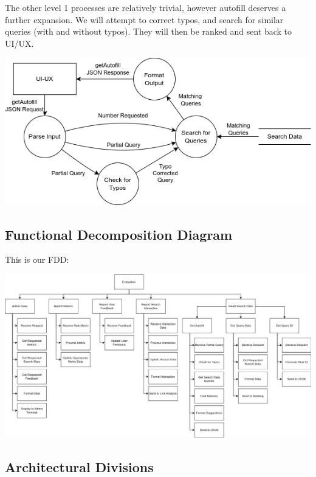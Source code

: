 \medskip

The other level 1 processes are relatively trivial, however autofill deserves a further expansion. We will attempt to correct typos, and search for similar queries (with and without typos). They will then be ranked and sent back to UI/UX.

\begin{center}
  \includegraphics[scale=0.5]{DFDs/LowLevelDFDs-GetAutofill.drawio (2).png}
\end{center}

\subsection*{Functional Decomposition Diagram}

This is our FDD:
\begin{center}
  \includegraphics[width=\textwidth]{FDD/FDD.png}
\end{center}

\subsection*{Architectural Divisions}